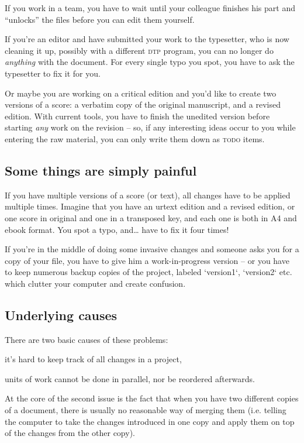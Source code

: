\documentclass[11pt,a4paper]{article}
\begin{document}
If you work in a team, you have to wait until your colleague finishes his part
and “unlocks” the files before you can edit them yourself.

If you're an editor and have submitted your work to the typesetter, who is now cleaning
it up, possibly with a different \textsc{dtp} program, you can no longer do \emph{anything}
with the document.  For every single typo you spot, you have to ask the typesetter to fix it
for you.

Or maybe you are working on a critical edition and you'd like to create two versions
of a score: a verbatim copy of the original manuscript, and a revised edition.
With current tools, you have to finish the unedited version before starting
\emph{any} work on the revision -- so, if any interesting ideas occur to you
while entering the raw material, you can only write them down as \textsc{todo}
items.

\subsection{Some things are simply painful}
If you have multiple versions of a score (or text), all changes have to be applied
multiple times.  Imagine that you have an urtext edition and a revised edition, or
one score in original and one in a transposed key,
and each one is both in A4 and ebook format.  You spot a typo, and\ldots
have to fix it four times!

If you're in the middle of doing some invasive changes and someone asks you for
a copy of your file, you have to give him a work-in-progress version -- or you
have to keep numerous backup copies of the project, labeled `version1`, `version2`
etc. which clutter your computer and create confusion.

\subsection{Underlying causes}
There are two basic causes of these problems:
\begin{itemize*}
\item it's hard to keep track of all changes in a project,
\item units of work cannot be done in parallel, nor be reordered afterwards.
\end{itemize*}

At the core of the second issue is the fact that when you have two different
copies of a document, there is usually no reasonable way of merging them
(i.e. telling the computer to take the changes introduced in one copy
and apply them on top of the changes from the other copy).
\end{document}
